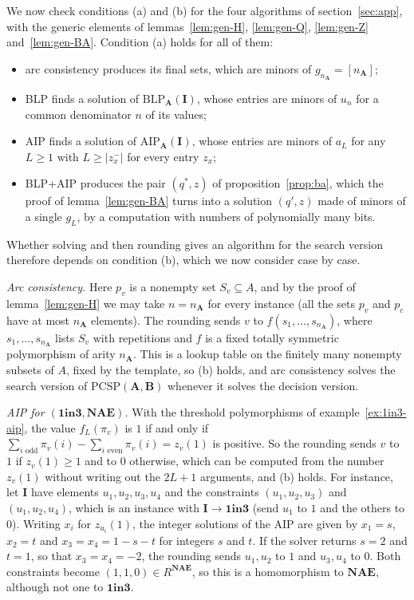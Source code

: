 \documentclass[11pt]{article}
\theoremstyle{plain}
\theoremstyle{definition}
\newcommand{\bA}{\mathbf{A}}
\newcommand{\bB}{\mathbf{B}}
\newcommand{\bI}{\mathbf{I}}
\newcommand{\OIT}{\mathbf{1in3}}
\newcommand{\NAE}{\mathbf{NAE}}
\newcommand{\PCSP}{\mathrm{PCSP}}
\newcommand{\BLP}{\mathrm{BLP}}
\newcommand{\AIP}{\mathrm{AIP}}
\begin{document}
We now check conditions (a) and (b) for the four algorithms of section~\ref{sec:app}, with the generic elements of lemmas~\ref{lem:gen-H}, \ref{lem:gen-Q}, \ref{lem:gen-Z} and~\ref{lem:gen-BA}. Condition (a) holds for all of them:
\begin{itemize}
  \item arc consistency produces its final sets, which are minors of $g_{n_{\bA}}=[n_{\bA}]$;
  \item BLP finds a solution of $\BLP_{\bA}(\bI)$, whose entries are minors of $u_n$ for a common denominator $n$ of its values;
  \item AIP finds a solution of $\AIP_{\bA}(\bI)$, whose entries are minors of $a_L$ for any $L\geq1$ with $L\geq|z_x^-|$ for every entry $z_x$;
  \item BLP+AIP produces the pair $(q^*,z)$ of proposition~\ref{prop:ba}, which the proof of lemma~\ref{lem:gen-BA} turns into a solution $(q',z)$ made of minors of a single $g_L$, by a computation with numbers of polynomially many bits.
\end{itemize}
Whether solving and then rounding gives an algorithm for the search version therefore depends on condition (b), which we now consider case by case.

\emph{Arc consistency.} Here $p_v$ is a nonempty set $S_v\subseteq A$, and by the proof of lemma~\ref{lem:gen-H} we may take $n=n_{\bA}$ for every instance (all the sets $p_v$ and $p_c$ have at most $n_{\bA}$ elements). The rounding sends $v$ to $f(s_1,\dots,s_{n_{\bA}})$, where $s_1,\dots,s_{n_{\bA}}$ lists $S_v$ with repetitions and $f$ is a fixed totally symmetric polymorphism of arity $n_{\bA}$. This is a lookup table on the finitely many nonempty subsets of $A$, fixed by the template, so (b) holds, and arc consistency solves the search version of $\PCSP(\bA,\bB)$ whenever it solves the decision version.

\emph{AIP for $(\OIT,\NAE)$.} With the threshold polymorphisms of example~\ref{ex:1in3-aip}, the value $f_L(\pi_v)$ is $1$ if and only if $\sum_{i\text{ odd}}\pi_v(i)-\sum_{i\text{ even}}\pi_v(i)=z_v(1)$ is positive. So the rounding sends $v$ to $1$ if $z_v(1)\geq1$ and to $0$ otherwise, which can be computed from the number $z_v(1)$ without writing out the $2L+1$ arguments, and (b) holds. For instance, let $\bI$ have elements $u_1,u_2,u_3,u_4$ and the constraints $(u_1,u_2,u_3)$ and $(u_1,u_2,u_4)$, which is an instance with $\bI\to\OIT$ (send $u_1$ to $1$ and the others to $0$). Writing $x_i$ for $z_{u_i}(1)$, the integer solutions of the AIP are given by $x_1=s$, $x_2=t$ and $x_3=x_4=1-s-t$ for integers $s$ and $t$. If the solver returns $s=2$ and $t=1$, so that $x_3=x_4=-2$, the rounding sends $u_1,u_2$ to $1$ and $u_3,u_4$ to $0$. Both constraints become $(1,1,0)\in R^{\NAE}$, so this is a homomorphism to $\NAE$, although not one to $\OIT$.
\end{document}
